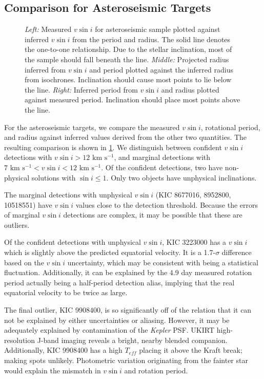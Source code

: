 \documentclass[manuscript]{aastex6}
\newcommand{\vsini}{\ensuremath{v \sin i}}
\newcommand{\Kepler}{\mbox{\textit{Kepler}}}
\newcommand{\Teff}{\ensuremath{T_{eff}}}
\newcommand{\kms}{\textrm{ km~s}\ensuremath{^{-1}}}
\begin{document}
\subsection{Comparison for Asteroseismic Targets}
\label{sec:astero}

\begin{figure}
    \caption{\emph{Left:} Measured \vsini{} for asteroseismic sample plotted
        against inferred \vsini{} from the period and radius. The solid line 
        denotes the one-to-one relationship. Due to the stellar inclination, most
        of the sample should fall beneath the line. \emph{Middle:} Projected
        radius inferred from \vsini{} and period plotted against the inferred
        radius from isochrones. Inclination should cause most points to lie
        below the line. \emph{Right:} Inferred period from \vsini{} and radius
        plotted against measured period. Inclination should place most points
    above the line.\label{fig:astero_rot}}
\end{figure}

For the asteroseismic targets, we compare the measured \vsini{}, rotational 
period, and radius against inferred values derived from
the other two quantities. The resulting comparison is shown in
\cref{fig:astero_rot}. We distinguish between confident \vsini{} detections
with \(\vsini > 12 \kms\), and marginal detections with \(7 \kms < \vsini < 12
\kms\). Of the confident detections, two  
have non-physical solutions with \(\sin i \le 1\). Only two objects have
unphysical inclinations.

The marginal detections with unphysical \vsini{} (KIC 8677016, 8952800, 10518551) 
have \vsini{} values close to the detection threshold. Because the errors of 
marginal \vsini{} detections are complex, 
it may be possible that these are outliers. 

Of the confident detections with unphysical \vsini{}, KIC 3223000 has a
\vsini{} which is slightly above the predicted equatorial velocity. It
is a 1.7-\(\sigma\) difference based on the \vsini{} uncertainty, which
may be consistent with being a statistical fluctuation. Additionally, it can
be explained by the 4.9 day measured rotation period actually being a 
half-period detection alias, implying that the real equatorial velocity to be twice 
as large. 

The final outlier, KIC 9908400, is so significantly off of the relation
that it can not be explained by either uncertainties or aliasing. However,
it may be adequately explained by contamination of the \Kepler{} PSF\@. UKIRT
high-resolution J-band imaging reveals a bright, nearby blended companion.
Additionally, KIC 9908400 has a high \Teff{} placing it above the Kraft break;
making spots unlikely. Photometric variation originating from the fainter 
star would explain the mismatch in \vsini{} and rotation period.
\end{document}
